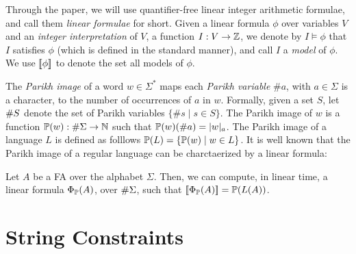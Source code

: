 \documentclass[sigplan,review,anonymous]{acmart}\settopmatter{printfolios=true,printccs=false,printacmref=false}
\begin{document}
Through the paper, we will use quantifier-free linear integer arithmetic formulae, and call them \emph{linear formulae} for short.  
Given a linear formula $\phi$ over variables $V$ and an \emph{integer interpretation} of $V$, a function $I:V\rightarrow \mathbb{Z}$, 
we denote by $I\models \phi$ that $I$ satisfies $\phi$ (which is defined in the standard manner), and call $I$ a \emph{model} of $\phi$. 
We use $[\![\phi]\!]$ to denote the set all models of $\phi$. 
%


The \emph{Parikh image} of a word $w\in \Sigma^*$ maps each \emph{Parikh variable} $\#a$, with $a \in \Sigma$ is a character, to the number of occurrences of $a$ in $w$.
Formally, given a set $S$, let $\#{S}$ denote the set of Parikh variables $\{\#s \mid s\in S\}$. 
The Parikh image of $w$ is a function $\mathbb{P}{(w)}:\#{\Sigma} \rightarrow \mathbb{N}$ such that $\mathbb{P}{(w)} (\#a) = |w|_a$. 
The Parikh image of a language $L$ is defined as folllows $\mathbb{P}{(L)} = \{\mathbb{P}{(w)} \mid w \in L\}$. %
%
It is well known that the Parikh image of a regular language  can be  charctaerized by a linear formula:



\begin{lemma}
Let $A$ be a FA over the alphabet $\Sigma$. Then, we can compute, in linear time,  a linear formula $\Phi_{\mathbb{P}}(A)$, over $\#{\Sigma}$, such that $[\![\Phi_{\mathbb{P}}(A)]\!] = \mathbb{P}{(L(A))}$.

\end{lemma}



 


\section{String Constraints} \label{section:sc}
\end{document}
